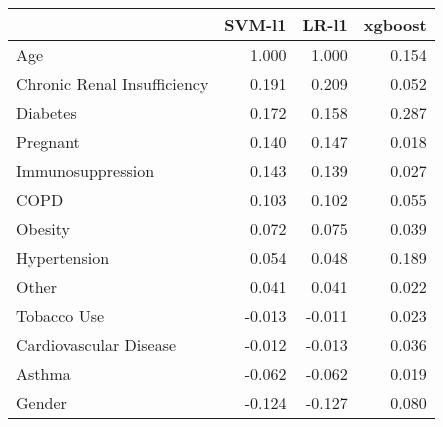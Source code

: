 \begin{tabular}{lrrr}
\toprule
{} &  SVM-l1 &  LR-l1 &  xgboost \\
\midrule
Age                         &   1.000 &  1.000 &    0.154 \\
Chronic Renal Insufficiency &   0.191 &  0.209 &    0.052 \\
Diabetes                    &   0.172 &  0.158 &    0.287 \\
Pregnant                    &   0.140 &  0.147 &    0.018 \\
Immunosuppression           &   0.143 &  0.139 &    0.027 \\
COPD                        &   0.103 &  0.102 &    0.055 \\
Obesity                     &   0.072 &  0.075 &    0.039 \\
Hypertension                &   0.054 &  0.048 &    0.189 \\
Other                       &   0.041 &  0.041 &    0.022 \\
Tobacco Use                 &  -0.013 & -0.011 &    0.023 \\
Cardiovascular Disease      &  -0.012 & -0.013 &    0.036 \\
Asthma                      &  -0.062 & -0.062 &    0.019 \\
Gender                      &  -0.124 & -0.127 &    0.080 \\
\bottomrule
\end{tabular}
